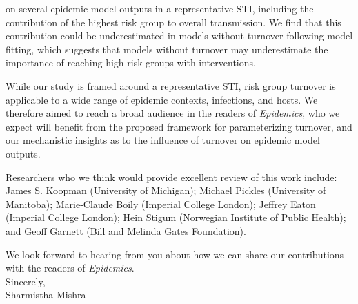 \documentclass[a4]{article}
\begin{document}
on several epidemic model outputs in a representative STI,
including the contribution of the highest risk group to overall transmission.
We find that this contribution could be underestimated in models without turnover
following model fitting,
which suggests that models without turnover may underestimate
the importance of reaching high risk groups with interventions.
\par
While our study is framed around a representative STI,
risk group turnover is applicable to a wide range of 
epidemic contexts, infections, and hosts.
We therefore aimed to reach a broad audience in the readers of \textit{Epidemics},
who we expect will benefit from the proposed framework for parameterizing turnover,
and our mechanistic insights as to the influence of turnover on epidemic model outputs.
\par
Researchers who we think would provide excellent review of this work include:
James S. Koopman (University of Michigan);
Michael Pickles (University of Manitoba);
Marie-Claude Boily (Imperial College London);
Jeffrey Eaton (Imperial College London);
Hein Stigum (Norwegian Institute of Public Health); and
Geoff Garnett (Bill and Melinda Gates Foundation).
\par
We look forward to hearing from you about how we can share our contributions
with the readers of \textit{Epidemics}.
\\[2em]
Sincerely,\\[1em]
Sharmistha Mishra
\end{document}
